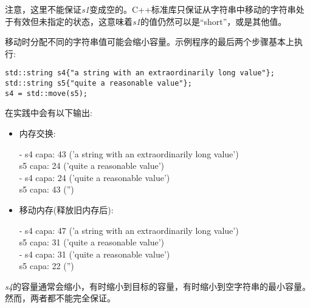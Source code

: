 注意，这里不能保证\textit{s1}变成空的。C++标准库只保证从字符串中移动的字符串处于有效但未指定的状态，这意味着\textit{s1}的值仍然可以是“short”，或是其他值。\par

移动时分配不同的字符串值可能会缩小容量。示例程序的最后两个步骤基本上执行:\par

\begin{lstlisting}[caption={}]
std::string s4{"a string with an extraordinarily long value"};
std::string s5{"quite a reasonable value"};
s4 = std::move(s5);
\end{lstlisting}

在实践中会有以下输出:\par

\begin{itemize}
	\item 内存交换:
	\begin{tcolorbox}[colback=white,colframe=black] 	
	- s4 capa: 43 ('a string with an extraordinarily long value') \\
	s5 capa: 24 ('quite a reasonable value') \\
	- s4 capa: 24 ('quite a reasonable value') \\
	s5 capa: 43 ('')
	\end{tcolorbox}	
	\item 移动内存(释放旧内存后):
	\begin{tcolorbox}[colback=white,colframe=black]
	- s4 capa: 47 ('a string with an extraordinarily long value') \\
	s5 capa: 31 ('quite a reasonable value') \\
	- s4 capa: 31 ('quite a reasonable value') \\
	s5 capa: 22 ('')
	\end{tcolorbox}	
\end{itemize}

\textit{s4}的容量通常会缩小，有时缩小到目标的容量，有时缩小到空字符串的最小容量。然而，两者都不能完全保证。\par













